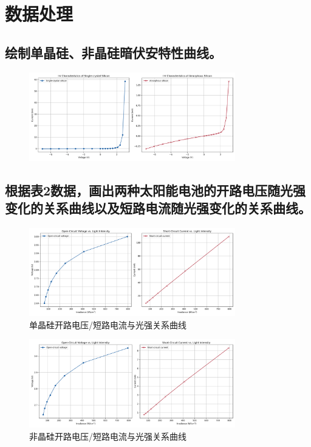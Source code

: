 \documentclass{ctexart}
\begin{document}
\newpage

\section{数据处理}

\subsection{绘制单晶硅、非晶硅暗伏安特性曲线。}

\begin{figure}[!htbp]
    \centering
    \includegraphics[width=0.8\textwidth]{1.png}
\end{figure}

\subsection{根据表2数据，画出两种太阳能电池的开路电压随光强变化的关系曲线以及短路电流随光强变化的关系曲线。}

\begin{figure}[!htbp]
    \centering
    \includegraphics[width=0.8\textwidth]{2_0.png}
    \caption{单晶硅开路电压/短路电流与光强关系曲线}
\end{figure}

\begin{figure}[!htbp]
    \centering
    \includegraphics[width=0.8\textwidth]{2_1.png}
    \caption{非晶硅开路电压/短路电流与光强关系曲线}
\end{figure}
\end{document}
